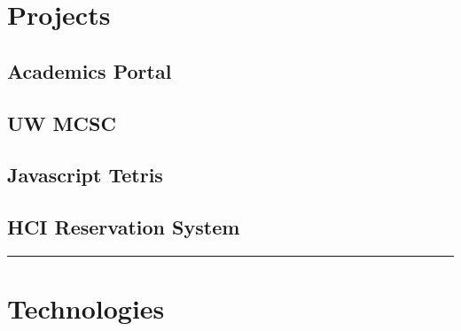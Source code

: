 \documentclass[letterpaper,11pt,notitlepage]{article}
\begin{document}
\section{Projects}
    \subsection{Academics Portal}
    \subsection{UW MCSC}
    \subsection{Javascript Tetris}
    \subsection{HCI Reservation System}
\rule[1mm]{\linewidth}{0.25mm}
\section{Technologies}
\end{document}
